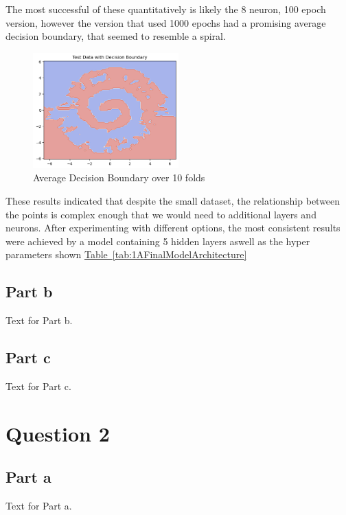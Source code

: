 \documentclass[runningheads]{llncs}
\begin{document}
The most successful of these quantitatively is likely the 8 neuron, 100 epoch version, however the version that used 1000 epochs had a promising average decision boundary, that seemed to resemble a spiral.

\begin{figure}[!htb]
  \centering
  \includegraphics[width=0.5\textwidth]{Question1Images/firstFFNNOutput.png}
  \caption{Average Decision Boundary over 10 folds}
  \label{fig:db}
\end{figure}
\FloatBarrier

These results indicated that despite the small dataset, the relationship between the points is complex enough that we would need to additional layers and neurons. After experimenting with different options, the most consistent results were achieved by a model containing 5 hidden layers aswell as the hyper parameters shown \hyperref[tab:1AFinalModelArchitecture]{Table~\ref*{tab:1AFinalModelArchitecture}} 

\subsection{Part b}

Text for Part b.

\subsection{Part c}

Text for Part c.

\section{Question 2}

\subsection{Part a}

Text for Part a.
\end{document}
